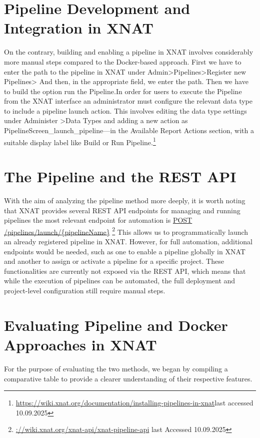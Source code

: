 \section{Pipeline Development and Integration in XNAT}
On the contrary, building and enabling a pipeline in XNAT involves considerably more manual steps compared to the Docker-based approach.
First we have to enter the path to the pipeline in XNAT under Admin>Pipelines>Register new Pipelines> And then, in the appropriate field, we enter the path. Then we have to build the option run the Pipeline.In order for users to execute the Pipeline from the XNAT interface an administrator must configure the relevant data type to include a pipeline launch action. This involves editing the data type settings under Administer >Data Types and adding a new action as PipelineScreen\_launch\_pipeline—in the Available Report Actions section, with a suitable display label like Build or Run Pipeline.\footnote{\url{https://wiki.xnat.org/documentation/installing-pipelines-in-xnat}last accessed 10.09.2025}

\section{The Pipeline and the REST API}
With the aim of analyzing the pipeline method more deeply, it is worth noting that XNAT provides several REST API endpoints for managing and running pipelines the most relevant endpoint for automation is \url{POST /pipelines/launch/{pipelineName}} \footnote{\url{://wiki.xnat.org/xnat-api/xnat-pipeline-api} last Accessed 10.09.2025}
This allows us to programmatically launch an already registered pipeline in XNAT. However, for full
automation, additional endpoints would be needed, such as one to enable a pipeline globally in XNAT and
another to assign or activate a pipeline for a specific project. These functionalities are currently not exposed via
the REST API, which means that while the execution of pipelines can be automated, the full deployment and
project-level configuration still require manual steps.

\section{Evaluating Pipeline and Docker Approaches in XNAT}

For the purpose of evaluating the two methods, we began by compiling a comparative table to provide a clearer understanding of their respective features. 




